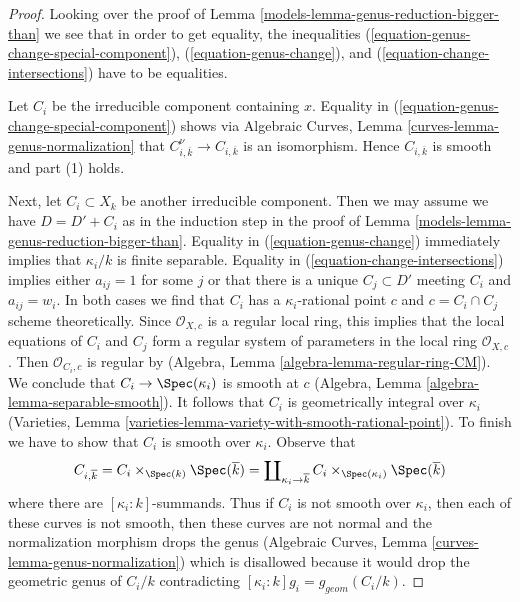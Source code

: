 \begin{proof}

Looking over the proof of Lemma \ref{models-lemma-genus-reduction-bigger-than}
we see that in order to get equality, the inequalities
(\ref{equation-genus-change-special-component}),
(\ref{equation-genus-change}), and
(\ref{equation-change-intersections})
have to be equalities.

\medskip\noindent
Let $C_i$ be the irreducible component containing $x$.
Equality in (\ref{equation-genus-change-special-component})
shows via
Algebraic Curves, Lemma \ref{curves-lemma-genus-normalization}
that $C_{i, \overline{k}}^\nu \to C_{i, \overline{k}}$ is
an isomorphism. Hence $C_{i, \overline{k}}$ is smooth
and part (1) holds.

\medskip\noindent
Next, let $C_i \subset X_k$ be another irreducible component.
Then we may assume we have $D =  D' + C_i$ as in the induction step
in the proof of Lemma \ref{models-lemma-genus-reduction-bigger-than}.
Equality in (\ref{equation-genus-change}) immediately implies
that $\kappa_i/k$ is finite separable.
Equality in (\ref{equation-change-intersections})
implies either $a_{ij} = 1$ for some $j$ or that there is a
unique $C_j \subset D'$ meeting $C_i$ and $a_{ij} = w_i$.
In both cases we find that $C_i$ has a $\kappa_i$-rational point
$c$ and $c = C_i \cap C_j$ scheme theoretically.
Since $\mathcal{O}_{X, c}$ is a regular local ring,
this implies that the local equations of $C_i$ and $C_j$
form a regular system of parameters in the local ring $\mathcal{O}_{X, c}$.
Then $\mathcal{O}_{C_i, c}$ is regular by
(Algebra, Lemma \ref{algebra-lemma-regular-ring-CM}).
We conclude that $C_i \to \Spec(\kappa_i)$ is smooth at $c$
(Algebra, Lemma \ref{algebra-lemma-separable-smooth}).
It follows that $C_i$ is geometrically integral over $\kappa_i$
(Varieties, Lemma \ref{varieties-lemma-variety-with-smooth-rational-point}).
To finish we have to show that $C_i$ is smooth over $\kappa_i$. Observe that
$$
C_{i, \overline{k}} = C_i \times_{\Spec(k)} \Spec(\overline{k})
= \coprod\nolimits_{\kappa_i \to \overline{k}}
C_i \times_{\Spec(\kappa_i)} \Spec(\overline{k})
$$
where there are $[\kappa_i : k]$-summands. Thus if $C_i$ is not
smooth over $\kappa_i$, then each of these curves is not smooth, then
these curves are not normal and the normalization morphism drops the genus
(Algebraic Curves, Lemma \ref{curves-lemma-genus-normalization})
which is disallowed because it would drop the geometric genus
of $C_i/k$ contradicting $[\kappa_i : k] g_i = g_{geom}(C_i/k)$.
\end{proof}

